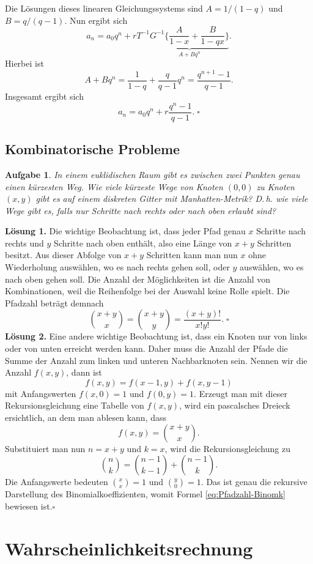 \documentclass[a4paper,10pt,fleqn,twoside]{scrartcl}
\numberwithin{equation}{section}
\newcommand{\strong}[1]{{\normalfont\sffamily\bfseries #1}}
\renewcommand{\qedsymbol}{\ensuremath{\square}}
\theoremstyle{Aufgabe}
\newtheorem{Aufgabe}{\sffamily Aufgabe}[section]
\begin{document}
Die Lösungen dieses linearen Gleichungssystems
sind $A=1/(1-q)$ und $B=q/(q-1)$. Nun ergibt sich
\[ a_n = a_0q^n + rT^{-1} \underbrace{G^{-1}\bigg\{\frac{A}{1-x} + \frac{B}{1-qx}\bigg\}}_{A+Bq^n}.\]
Hierbei ist
\[ A+Bq^n = \frac{1}{1-q}+\frac{q}{q-1}q^n = \frac{q^{n+1}-1}{q-1}.\]
Insgesamt ergibt sich
\[ a_n = a_0q^n + r\frac{q^n-1}{q-1}.\;\qedsymbol\]

\newpage
\subsection{Kombinatorische Probleme}
\begin{Aufgabe}
In einem euklidischen Raum gibt es zwischen zwei Punkten genau einen
kürzesten Weg. Wie viele kürzeste Wege von Knoten $(0,0)$ zu Knoten
$(x,y)$ gibt es auf einem diskreten Gitter mit Manhatten-Metrik? D.\,h.
wie viele Wege gibt es, falls nur Schritte nach rechts oder nach
oben erlaubt sind?
\end{Aufgabe}
\strong{Lösung 1.} Die wichtige Beobachtung ist, dass jeder Pfad genau
$x$ Schritte nach rechts und $y$ Schritte nach oben enthält, also
eine Länge von $x+y$ Schritten besitzt. Aus dieser Abfolge von
$x+y$ Schritten kann man nun $x$ ohne Wiederholung auswählen, wo es
nach rechts gehen soll, oder $y$ auswählen, wo es nach oben gehen soll.
Die Anzahl der Möglichkeiten ist die Anzahl von Kombinationen,
weil die Reihenfolge bei der Auswahl keine Rolle spielt. Die
Pfadzahl beträgt demnach
\[\binom{x+y}{x} = \binom{x+y}{y} = \frac{(x+y)!}{x!y!}.\;\qedsymbol\]
\strong{Lösung 2.} Eine andere wichtige Beobachtung ist, dass ein
Knoten nur von links oder von unten erreicht werden kann. Daher muss
die Anzahl der Pfade die Summe der Anzahl zum linken und unteren
Nachbarknoten sein. Nennen wir die Anzahl $f(x,y)$, dann ist
\[f(x,y) = f(x-1,y) + f(x,y-1)\]
mit Anfangswerten $f(x,0)=1$ und $f(0,y)=1$. Erzeugt man mit
dieser Rekursionsgleichung eine Tabelle von $f(x,y)$, wird ein
pascalsches Dreieck ersichtlich, an dem man ablesen kann, dass
\begin{equation}\label{eq:Pfadzahl-Binomk}
f(x,y) = \binom{x+y}{x}.
\end{equation}
Substituiert man nun $n=x+y$ und $k=x$, wird
die Rekursionsgleichung zu
\[\binom{n}{k} = \binom{n-1}{k-1} + \binom{n-1}{k}.\]
Die Anfangswerte bedeuten $\binom{x}{x} = 1$ und $\binom{y}{0} = 1$.
Das ist genau die rekursive Darstellung des Binomialkoeffizienten,
womit Formel \eqref{eq:Pfadzahl-Binomk} bewiesen ist.\;\qedsymbol

\newpage
\section{Wahrscheinlichkeitsrechnung}
\end{document}
